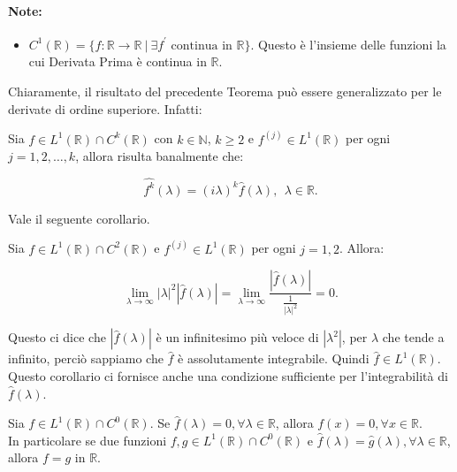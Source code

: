 \paragraph{Note:}
\begin{itemize}
    \item $C^1(\mathbb{R}) = \{ f: \mathbb{R} \rightarrow \mathbb{R} \ | \
              \exists f^{\prime} \text{ continua in } \mathbb{R} \}$. Questo è
          l'insieme delle funzioni la cui Derivata Prima è continua in
          $\mathbb{R}$.
\end{itemize}

Chiaramente, il risultato del precedente Teorema può essere generalizzato per le
derivate di ordine superiore. Infatti:

\begin{theorem}
    Sia $f \in L^1(\mathbb{R}) \cap C^k(\mathbb{R})$ con $k \in \mathbb{N}$, $k
        \geq 2$ e $f^{\left(j\right)} \in L^1(\mathbb{R})$ per ogni $j = 1, 2,
        \ldots, k$, allora risulta banalmente che:

    $$
        \widehat{f^k}(\lambda) = (i \lambda)^k \hat{f}(\lambda), \ \ \lambda \in
        \mathbb{R}.
    $$
\end{theorem}

Vale il seguente corollario.

\begin{corollary}
    Sia $f \in L^1(\mathbb{R}) \cap C^2(\mathbb{R})$ e $f^{\left(j\right)} \in
        L^1(\mathbb{R})$ per ogni $j = 1, 2$. Allora:

    $$
        \lim_{\lambda \rightarrow \infty} \left| \lambda \right|^2 \left|
        \hat{f}(\lambda) \right|  = \lim_{\lambda \rightarrow \infty}
        \frac{\left|\hat{f}(\lambda)\right|}{ \frac{1}{ \left| \lambda
                \right|^2}} = 0.
    $$
\end{corollary}

Questo ci dice che $\left|\hat{f}(\lambda)\right|$ è un infinitesimo più veloce di
$\left|\lambda^2\right|$, per $\lambda$ che tende a infinito, perciò sappiamo che $\hat{f}$ è
assolutamente integrabile. Quindi $\hat{f} \in L^1(\mathbb{R})$. Questo
corollario ci fornisce anche una condizione sufficiente per l'integrabilità di
$\hat{f}(\lambda)$.

\begin{theorem}
    Sia $f \in L^1(\mathbb{R}) \cap C^0(\mathbb{R})$.
    Se $\hat{f}(\lambda) = 0, \forall \lambda \in \mathbb{R}$, allora $f(x) = 0, \forall x \in \mathbb{R}$.\\
    In particolare se due funzioni $f, g \in L^1(\mathbb{R}) \cap C^0(\mathbb{R})$ e $\hat{f}(\lambda) = \hat{g}(\lambda), \forall \lambda \in \mathbb{R}$,
    allora $f = g$ in $\mathbb{R}$.
\end{theorem}

